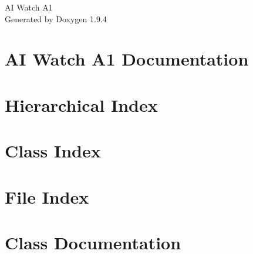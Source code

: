 \documentclass[twoside]{book}
\newcommand{\+}{\discretionary{\mbox{\scriptsize$\hookleftarrow$}}{}{}}
\newcommand{\clearemptydoublepage}{%
    \newpage{\pagestyle{empty}\cleardoublepage}%
  }
\begin{document}
  \raggedbottom
    \hypersetup{pageanchor=false,
                bookmarksnumbered=true,
                pdfencoding=unicode
               }
  \begin{titlepage}
  \vspace*{7cm}
  \begin{center}%
  {\Large AI Watch A1}\\
  \vspace*{1cm}
  {\large Generated by Doxygen 1.9.4}\\
  \end{center}
  \end{titlepage}
  \clearemptydoublepage
  \tableofcontents
  \clearemptydoublepage
  \hypersetup{pageanchor=true}
\chapter{AI Watch A1 Documentation}
\label{index}\hypertarget{index}{}
\chapter{Hierarchical Index}

\chapter{Class Index}

\chapter{File Index}

\chapter{Class Documentation}



















\end{document}
